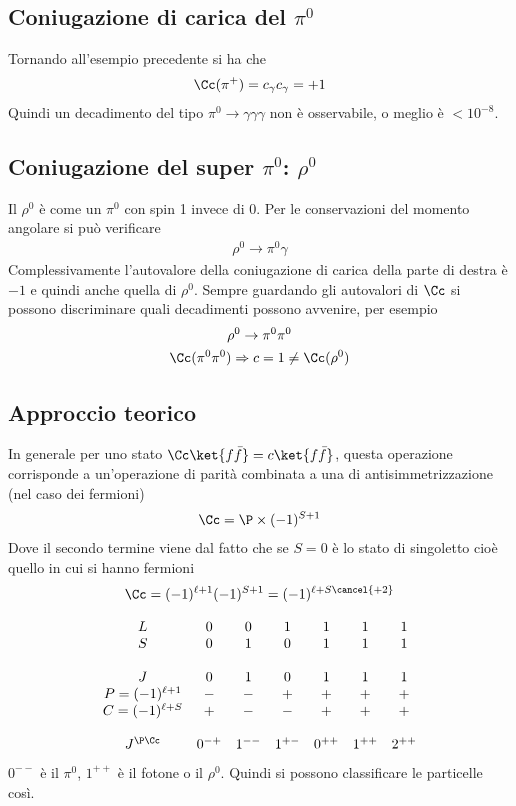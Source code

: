 \documentclass[12pt]{book}
\begin{document}
\subsection{Coniugazione di carica del $\pi^0$}
Tornando all'esempio precedente si ha che 
\begin{gather}
	\Cc ( \pi^+ ) = c_\gamma c_\gamma =+1
\end{gather} 
Quindi un decadimento del tipo $\pi^0 \rightarrow \gamma \gamma \gamma$ non è osservabile, o meglio è $<10^{-8}$.

\subsection{Coniugazione del super $\pi^0$: $\rho^0$}
Il $\rho^0$ è come un $\pi^0$ con spin 1 invece di 0. Per le conservazioni del momento angolare si può verificare
\begin{gather}
	\rho^0 \rightarrow \pi^0 \gamma
\end{gather}
Complessivamente l'autovalore della coniugazione di carica della parte di destra è $-1$ e quindi anche quella di $\rho^0$. Sempre guardando gli autovalori di $\Cc$ si possono discriminare quali decadimenti possono avvenire, per esempio
\begin{gather}
	\rho^0 \rightarrow \pi^0 \pi^0 \\
	\Cc ( \pi^0 \pi^0) \Rightarrow c= 1 \neq \Cc (\rho^0) 
\end{gather}


\subsection{Approccio teorico}
In generale per uno stato $\Cc \ket{f \bar f}= c \ket{ f \bar f}$, questa operazione corrisponde a un'operazione di parità combinata a una di antisimmetrizzazione (nel caso dei fermioni)
\begin{gather}
	\Cc = \P \times (-1)^{S+1}
\end{gather}
Dove il secondo termine viene dal fatto che se $S=0$ è lo stato di singoletto cioè quello in cui si hanno fermioni
\begin{gather}
	\Cc = (-1)^{\ell +1} (-1)^{S+1} = (-1)^{\ell+ S \cancel{+2}}
\end{gather}

\begin{gather}
	\begin{matrix}
		L & 0 & 0  & 1& 1 & 1 & 1\\
		S &0 &1& 0&1 & 1&1 \\ \\
		J &0 & 1 & 0 & 1& 1 & 1\\
		P = (-1)^{\ell+1} & - & - & +& + & + &+\\
		C = (-1)^{\ell+S} & + & - &- & + & + &+ \\ \\
		J^{\P \Cc} &0^{-+} & 1^{- - } & 1^{+-} & 0^{++} & 1^{++} & 2^{++}
	\end{matrix}
\end{gather}
$0^{--}$ è il $\pi^0$, $1^{++}$ è il fotone o il $\rho^0$. Quindi si possono classificare le particelle così.
\end{document}
